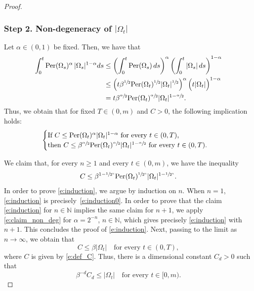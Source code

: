 \documentclass[JEP,XML,SOM,Unicode]{cedram}
\newcommand{\Per}{\mathrm{Per}}
\theoremstyle{plain}
\theoremstyle{definition}
\def\N{\mathbb{N}}
\begin{document}
\begin{proof}
\subsubsection*{Step 2. Non-degeneracy of $|\Omega_t|$}
Let $\alpha\in(0,1)$ be fixed. Then, we have that
\begin{align*}
\int_0^t \Per(\Omega_s)^\alpha\,|\Omega_s|^{1-\alpha} ds&\le \left(\int_0^t \Per(\Omega_s)\,ds\right)^{\alpha}\left(\int_0^t|\Omega_s|\,ds\right)^{1-\alpha}\\
&\le \left(t\beta^{\sfrac12} \Per(\Omega_t)^{\sfrac12}|\Omega_t|^{\sfrac12}\right)^{\alpha}\Big(t|\Omega_t|\Big)^{1-\alpha}\\
&=t\beta^{\sfrac{\alpha}{2}} \Per(\Omega_t)^{\sfrac\alpha2}|\Omega_t|^{1-\sfrac\alpha2}.
\end{align*}
Thus, we obtain that for fixed $T\in(0,m)$ and $C>0$, the following implication holds:%
\begin{equation}\label{e:claim_non_deg}
\begin{cases}
\text{If $C\le \Per(\Omega_t)^\alpha|\Omega_t|^{1-\alpha}$ for every $t\in(0,T)$,}\\
\text{then $C\le \beta^{\sfrac\alpha2} \Per(\Omega_t)^{\sfrac\alpha2}|\Omega_t|^{1-\sfrac\alpha2}$ for every $t\in(0,T)$.}
\end{cases}
\end{equation}

We claim that, for every $n\ge 1$ and every $t\in(0,m)$, we have the inequality
\begin{equation}\label{e:induction}
C\le \beta^{1-\sfrac{1}{2^{n}}}\Per(\Omega_t)^{\sfrac{1}{2^{n}}}|\Omega_t|^{1-\sfrac{1}{2^{n}}}.
\end{equation}
In order to prove \eqref{e:induction}, we argue by induction on $n$. When $n=1$, \eqref{e:induction} is precisely~\eqref{e:induction0}. In order to prove that the claim \eqref{e:induction} for $n\in \N$ implies the same claim for $n+1$, we apply \eqref{e:claim_non_deg} for $\alpha=2^{-n}$, $n\in\N$, which gives precisely \eqref{e:induction} with $n+1$. This concludes the proof of \eqref{e:induction}. Next, passing to the limit as $n\to\infty$, we obtain that
\[C\le \beta |\Omega_t|\quad\text{for every } t\in(0,T),\]
where $C$ is given by \eqref{e:def_C}. Thus, there is a dimensional constant $C_d>0$ such that
\begin{equation}\label{e:measure_non_degeneracy}
\beta^{-d} C_d\le |\Omega_t|\quad\text{for every } t\in[0,m).
\end{equation}


\end{proof}
\end{document}
